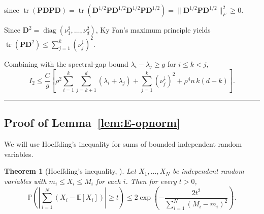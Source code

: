 \documentclass{article}
\newcommand{\Ex}[1]{\mbox{}\mathbb{E}\left[#1\right]}
\newcommand{\pr}[1]{\mbox{}\mathbb{P}\left(#1\right)}
\newcommand{\Db}{\mathbf{D}}
\newcommand{\Pb}{\mathbf{P}}
\newcommand{\BlackBox}{\rule{1.5ex}{1.5ex}}  %
\newenvironment{proof}{\par\noindent{\bf Proof\ }}{\hfill\BlackBox\par\medskip}
\newtheorem{theorem}{Theorem}
\newcommand{\tr}{\mathop{\mathrm{tr}}}
\newcommand{\diag}{\mathop{\mathrm{diag}}}
\newcommand{\rbr}[1]{\left(#1\right)}
\newcommand{\sbr}[1]{\left[#1\right]}
\newcommand{\abr}[1]{\left|#1\right|}
\begin{document}
\begin{proof}
since $\tr(\Pb\Db\Pb\Db) = \tr(\Db^{1/2} \Pb \Db^{1/2}  \Db^{1/2} \Pb  \Db^{1/2}) = \|\Db^{1/2}\Pb\Db^{1/2}\|_F^2 \ge 0$. 

Since $\Db^2 = \diag(\nu_1^2,\dots,\nu_d^2)$, Ky Fan's maximum principle yields $\tr(\Pb\Db^2) \le \sum_{j=1}^{k}(\nu_j^\downarrow)^2$. 

Combining with the spectral-gap bound $\lambda_i-\lambda_j \ge g$ for $i\le k<j$,
\begin{equation*}
    I_2 \le \frac{C}{g}\sbr{\rho^2\sum_{i=1}^{k}\sum_{j=k+1}^{d}(\lambda_i+\lambda_j) + \sum_{j=1}^{k}(\nu_j^\downarrow)^2 + \rho^4 n\,k(d-k)}.
\end{equation*}
\end{proof}

\subsection{Proof of Lemma~\ref{lem:E-opnorm}}\label{app:E-opnorm}

We will use Hoeffding's inequality for sums of bounded independent random variables.

\begin{theorem}[Hoeffding's inequality, {\citealp[Theorem~2.2.6]{Vershynin_2026}}]\label{thm:hoeffding}
Let $X_1,\dots,X_N$ be independent random variables with $m_i \le X_i \le M_i$ for each $i$. Then for every $t > 0$,
\begin{equation*}
    \pr{\abr{\sum_{i=1}^{N}\rbr{X_i - \Ex{X_i}}} \ge t} \le 2\exp\rbr{-\frac{2 t^2}{\sum_{i=1}^{N}(M_i - m_i)^2}}.
\end{equation*}
\end{theorem}
\end{document}
